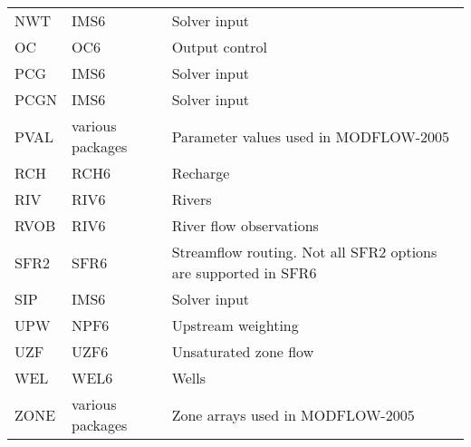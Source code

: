 \documentclass[11pt,twoside,twocolumn]{usgsreport}
\begin{document}
\begin{table}[ht]
\begin{tabular*}{\columnwidth}{l l l}
NWT & IMS6 & Solver input \\
OC & OC6 & Output control \\
PCG & IMS6 & Solver input  \\
PCGN & IMS6 & Solver input  \\
PVAL & various packages & Parameter values used in MODFLOW-2005 \\
RCH & RCH6 & Recharge \\
RIV & RIV6 & Rivers \\
RVOB & RIV6 & River flow observations  \\
SFR2 & SFR6 & Streamflow routing. Not all SFR2 options are supported in SFR6  \\
SIP & IMS6 & Solver input  \\
UPW & NPF6 & Upstream weighting \\
UZF & UZF6 & Unsaturated zone flow \\
WEL & WEL6 & Wells \\
ZONE & various packages & Zone arrays used in MODFLOW-2005 \\
\hline 
\end{tabular*}
\label{tab:supportedpackages}
\normalsize
\end{table}

\REFSECTION



\justifying
\vspace*{\fill}
\clearpage
\pagestyle{backofreport}
\makebackcover
\end{document}
